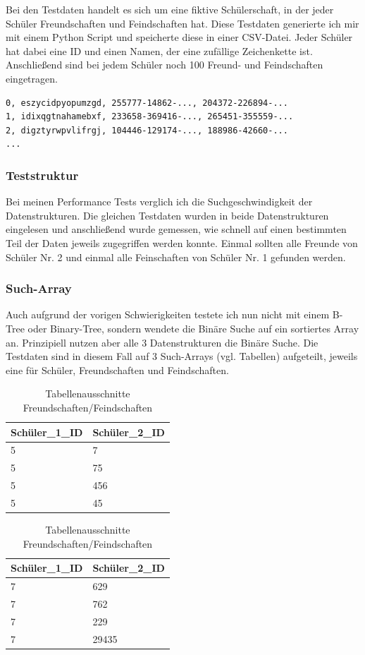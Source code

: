 \documentclass[11pt,a4paper]{article}
\begin{document}
Bei den Testdaten handelt es sich um eine fiktive Schülerschaft, in der jeder
Schüler Freundschaften und Feindschaften hat. Diese Testdaten generierte ich mir
mit einem Python Script und speicherte diese in einer CSV-Datei.
Jeder Schüler hat dabei eine ID und einen Namen, der eine zufällige Zeichenkette ist.
Anschließend sind bei jedem Schüler noch 100 Freund- und Feindschaften eingetragen.

\begin{lstlisting}
0, eszycidpyopumzgd, 255777-14862-..., 204372-226894-...
1, idixqgtnahamebxf, 233658-369416-..., 265451-355559-...
2, digztyrwpvlifrgj, 104446-129174-..., 188986-42660-...
...
\end{lstlisting}

\subsubsection{Teststruktur}

Bei meinen Performance Tests verglich ich die Suchgeschwindigkeit der Datenstrukturen.
Die gleichen Testdaten wurden in beide Datenstrukturen eingelesen und anschließend
wurde gemessen, wie schnell auf einen bestimmten Teil der Daten jeweils zugegriffen
werden konnte. Einmal sollten alle Freunde von Schüler Nr. 2 und einmal alle
Feinschaften von Schüler Nr. 1 gefunden werden.

\subsubsection{Such-Array}

Auch aufgrund der vorigen Schwierigkeiten testete ich nun nicht
mit einem B-Tree oder Binary-Tree, sondern wendete die Binäre Suche
auf ein sortiertes Array an. Prinzipiell nutzen aber alle 3 Datenstrukturen die
Binäre Suche. Die Testdaten sind in diesem Fall auf 3 Such-Arrays (vgl. Tabellen)
aufgeteilt, jeweils eine für Schüler, Freundschaften und Feindschaften.

\begin{table}[H]
    \centering
    \begin{tabular}{|l|l|}
        \hline
        Schüler\_1\_ID & Schüler\_2\_ID \\ \hline
        5          & 7          \\ \hline
        5        & 75         \\ \hline
        5        & 456        \\ \hline
        5       & 45         \\ \hline
    \end{tabular}
    \qquad
    \begin{tabular}{|l|l|}
        \hline
        Schüler\_1\_ID & Schüler\_2\_ID \\ \hline
        7          & 629          \\ \hline
        7        & 762         \\ \hline
        7        & 229        \\ \hline
        7       & 29435         \\ \hline
    \end{tabular}
    \caption{Tabellenausschnitte Freundschaften/Feindschaften}
\end{table}
\end{document}
